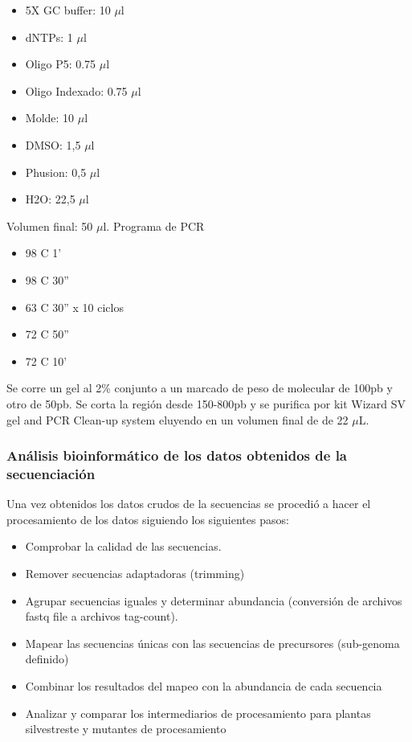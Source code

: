 \begin{itemize}
	\item 5X GC buffer: 10 $\mu$l
	\item dNTPs: 1 $\mu$l
	\item Oligo P5: 0.75 $\mu$l
	\item Oligo Indexado: 0.75 $\mu$l
	\item Molde: 10 $\mu$l 
	\item DMSO: 1,5 $\mu$l
	\item Phusion: 0,5 $\mu$l
	\item H2O: 22,5 $\mu$l
\end{itemize}
Volumen final: 50 $\mu$l.
Programa de PCR

\begin{itemize}
	\item 98 \degree C 1'
	\item 98 \degree C 30''
	\item 63 \degree C 30'' x 10 ciclos
	\item 72 \degree C 50''
	\item 72 \degree C 10'
\end{itemize}

Se corre un gel al 2\% conjunto a un marcado de peso de molecular de 100pb y otro de 50pb.
Se corta la región desde 150-800pb y se purifica por kit Wizard SV gel and PCR Clean-up system eluyendo en un volumen final de de 22 $\mu$L.

\subsubsection{Análisis bioinformático de los datos obtenidos de la secuenciación}

Una vez obtenidos los datos crudos de la secuencias se procedió a hacer el procesamiento de los datos siguiendo los siguientes pasos:
\begin{itemize}
	\item Comprobar la calidad de las secuencias.
	\item Remover secuencias adaptadoras (trimming)
	\item Agrupar secuencias iguales y determinar abundancia (conversión de archivos fastq file a archivos tag-count).
	\item Mapear las secuencias únicas con las secuencias de precursores (sub-genoma definido)
	\item Combinar los resultados del mapeo con la abundancia de cada secuencia
	\item Analizar y comparar los intermediarios de procesamiento para plantas silvestreste y mutantes de procesamiento
\end{itemize}


